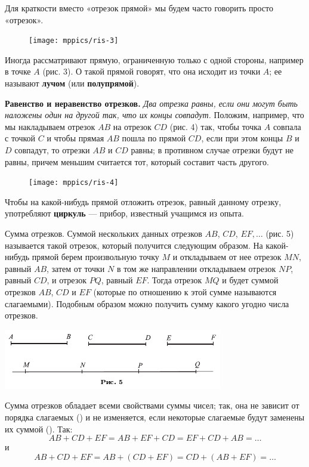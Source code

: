 \documentclass[oneside]{book}
\begin{document}
Для краткости вместо «отрезок прямой» мы будем часто говорить просто «отрезок».

\begin{figure}
\texttt{[image: mppics/ris-3]}
\caption{}
\end{figure}

Иногда рассматривают прямую, ограниченную только с одной стороны, например в точке $A$ (рис. 3).
О такой прямой говорят, что она исходит из точки $A$;
ее называют \textbf{лучом} (или \textbf{полупрямой}). %

\textbf{Равенство и неравенство отрезков.}
\emph{Два отрезка равны, если они могут быть наложены один на другой так, что их концы совпадут.}
Положим, например, что мы накладываем отрезок $AB$ на
отрезок $CD$ (рис. 4) так, чтобы точка $A$ совпала с точкой $C$ и чтобы прямая $AB$ пошла по прямой $CD$, если при этом концы $B$ и $D$ совпадут, то отрезки $AB$ и $CD$ равны;
в противном случае отрезки будут не равны, причем меньшим считается тот, который составит часть другого.


\begin{figure}[h]
\begin{center}
\texttt{[image: mppics/ris-4]}
\caption{}
\end{center}
\end{figure}


Чтобы на какой-нибудь прямой отложить отрезок, равный данному отрезку, употребляют \textbf{циркуль} — прибор, известный учащимся из опыта.

Сумма отрезков.
Суммой нескольких данных отрезков $AB$, $CD$, $EF,\dots$
(рис. 5) называется такой отрезок, который получится следующим образом.
На какой-нибудь прямой берем произвольную точку $M$ и откладываем от нее отрезок $MN$, равный $AB$, затем от точки $N$ в том же направлении откладываем отрезок $NP$, равный $CD$, и отрезок $PQ$, равный $EF$.
Тогда отрезок $MQ$ и будет суммой отрезков $AB$, $CD$ и $EF$ (которые по отношению к этой сумме называются слагаемыми).
Подобным образом можно получить сумму какого угодно числа отрезков.

\includegraphics{pics/ris-5}

Сумма отрезков обладает всеми свойствами суммы чисел;
так, она не зависит от порядка слагаемых () и не изменяется, если некоторые слагаемые будут заменены их суммой ().
Так:
\[AB+CD+EF=AB+EF+CD=EF+CD+AB=\dots\]
и
\[AB+CD+EF=AB+(CD+EF)=CD+(AB+EF)=\dots\]
\end{document}
